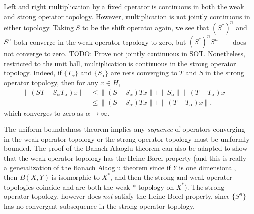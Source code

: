 Left and right multiplication by a fixed operator is continuous in both the weak and strong operator topology. However, multiplication is not jointly continuous in either topology. Taking $S$ to be the shift operator again, we see that $(S^*)^n$ and $S^n$ both converge in the weak operator topology to zero, but $(S^*)^n S^n = 1$ does not converge to zero. TODO: Prove not jointly continuous in SOT. Nonetheless, restricted to the unit ball, multiplication is continuous in the strong operator topology. Indeed, if $\{ T_\alpha \}$ and $\{ S_\alpha \}$ are nets converging to $T$ and $S$ in the strong operator topology, then for any $x \in H$,
%
\begin{align*}
    \| (ST - S_\alpha T_\alpha) x \| &\leq \| (S - S_\alpha) T x \| + \| S_\alpha \| \| (T - T_\alpha) x \|\\
    &\leq \| (S - S_\alpha) Tx \| + \| (T - T_\alpha) x \|,
\end{align*}
%
which converges to zero as $\alpha \to \infty$.

The uniform boundedness theorem implies any \emph{sequence} of operators converging in the weak operator topology or the strong operator topology must be uniformly bounded. The proof of the Banach-Alaoglu theorem can also be adapted to show that the weak operator topology has the Heine-Borel property (and this is really a generalization of the Banach Alaoglu theorem since if $Y$ is one dimensional, then $B(X,Y)$ is isomorphic to $X^*$, and then the strong and weak operator topologies coincide and are both the weak $*$ topology on $X^*$). The strong operator topology, however does \emph{not} satisfy the Heine-Borel property, since $\{ S^n \}$ has no convergent subsequence in the strong operator topology.

